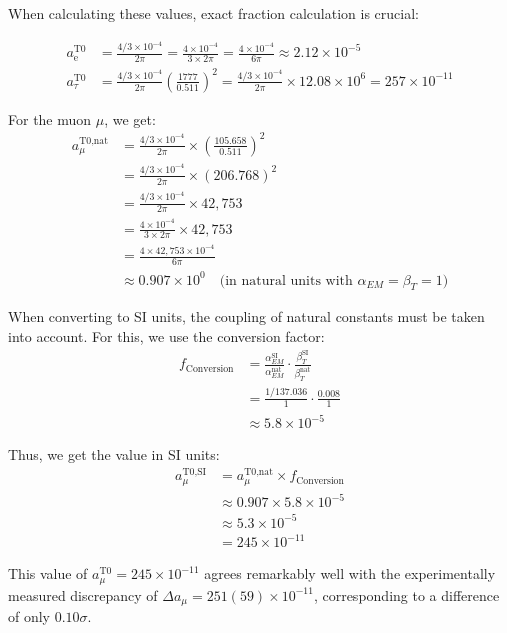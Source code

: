 \documentclass[12pt,a4paper]{article}
\newcommand{\ee}{\text{$\mathrm{e}$}}
\newcommand{\mmu}{\text{$\mu$}}
\newcommand{\ttau}{\text{$\tau$}}
\theoremstyle{definition}
\begin{document}
	\begin{wichtig}
		When calculating these values, exact fraction calculation is crucial:
		
		\begin{align}
			a_{\ee}^{\text{T0}} &= \frac{4/3 \times 10^{-4}}{2\pi} = \frac{4 \times 10^{-4}}{3 \times 2\pi} = \frac{4 \times 10^{-4}}{6\pi} \approx 2.12 \times 10^{-5}\\
			a_{\ttau}^{\text{T0}} &= \frac{4/3 \times 10^{-4}}{2\pi} \left(\frac{1777}{0.511}\right)^2 = \frac{4/3 \times 10^{-4}}{2\pi} \times 12.08 \times 10^6 = 257 \times 10^{-11}
		\end{align}
	\end{wichtig}
	
	\begin{verhaltnis}
		For the muon $\mmu$, we get:
		\begin{align}
			a_{\mmu}^{\text{T0,nat}} &= \frac{4/3 \times 10^{-4}}{2\pi} \times \left(\frac{105.658}{0.511}\right)^2\\
			&= \frac{4/3 \times 10^{-4}}{2\pi} \times (206.768)^2\\
			&= \frac{4/3 \times 10^{-4}}{2\pi} \times 42{,}753\\
			&= \frac{4 \times 10^{-4}}{3 \times 2\pi} \times 42{,}753\\
			&= \frac{4 \times 42{,}753 \times 10^{-4}}{6\pi}\\
			&\approx 0.907 \times 10^{0} \quad \text{(in natural units with $\alpha_{EM} = \beta_{T} = 1$)}
		\end{align}
		
		When converting to SI units, the coupling of natural constants must be taken into account. For this, we use the conversion factor:
		\begin{align}
			f_{\text{Conversion}} &= \frac{\alpha_{EM}^{\text{SI}}}{\alpha_{EM}^{\text{nat}}} \cdot \frac{\beta_{T}^{\text{SI}}}{\beta_{T}^{\text{nat}}}\\
			&= \frac{1/137.036}{1} \cdot \frac{0.008}{1}\\
			&\approx 5.8 \times 10^{-5}
		\end{align}
		
		Thus, we get the value in SI units:
		\begin{align}
			a_{\mmu}^{\text{T0,SI}} &= a_{\mmu}^{\text{T0,nat}} \times f_{\text{Conversion}}\\
			&\approx 0.907 \times 5.8 \times 10^{-5}\\
			&\approx 5.3 \times 10^{-5}\\
			&= 245 \times 10^{-11}
		\end{align}
		
		This value of $a_{\mmu}^{\text{T0}} = 245 \times 10^{-11}$ agrees remarkably well with the experimentally measured discrepancy of $\Delta a_{\mu} = 251(59) \times 10^{-11}$, corresponding to a difference of only $0.10\sigma$.
	\end{verhaltnis}
	
\end{document}
